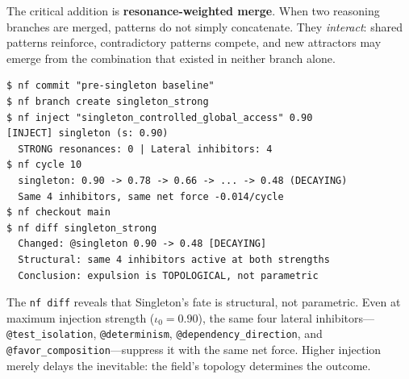 The critical addition is \textbf{resonance-weighted merge}.  When two
reasoning branches are merged, patterns do not simply concatenate.
They \emph{interact}: shared patterns reinforce, contradictory
patterns compete, and new attractors may emerge from the combination
that existed in neither branch alone.

\begin{terminalbox}
\begin{lstlisting}[style=neosshell, caption={Versioned reasoning: branching to test a counterfactual.}, label={lst:versioning}]
$ nf commit "pre-singleton baseline"
$ nf branch create singleton_strong
$ nf inject "singleton_controlled_global_access" 0.90
[INJECT] singleton (s: 0.90)
  STRONG resonances: 0 | Lateral inhibitors: 4
$ nf cycle 10
  singleton: 0.90 -> 0.78 -> 0.66 -> ... -> 0.48 (DECAYING)
  Same 4 inhibitors, same net force -0.014/cycle
$ nf checkout main
$ nf diff singleton_strong
  Changed: @singleton 0.90 -> 0.48 [DECAYING]
  Structural: same 4 inhibitors active at both strengths
  Conclusion: expulsion is TOPOLOGICAL, not parametric
\end{lstlisting}
\end{terminalbox}

The \texttt{nf diff} reveals that Singleton's fate is structural, not
parametric.  Even at maximum injection strength ($\iota_0 = 0.90$), the
same four lateral inhibitors---\texttt{@test\_isolation},
\texttt{@determinism}, \texttt{@dependency\_direction}, and
\texttt{@favor\_composition}---suppress it with the same net force.
Higher injection merely delays the inevitable: the field's topology
determines the outcome.

